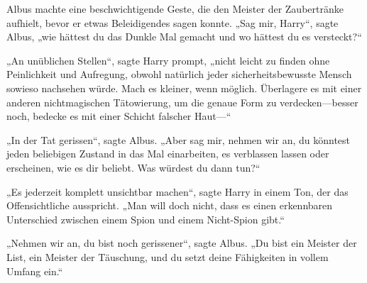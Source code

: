 Albus machte eine beschwichtigende Geste, die den Meister der Zaubertränke aufhielt, bevor er etwas Beleidigendes sagen konnte. „Sag mir, Harry“, sagte Albus, „wie hättest du das Dunkle Mal gemacht und wo hättest du es versteckt?“

„An unüblichen Stellen“, sagte Harry prompt, „nicht leicht zu finden ohne Peinlichkeit und Aufregung, obwohl natürlich jeder sicherheitsbewusste Mensch sowieso nachsehen würde. Mach es kleiner, wenn möglich. Überlagere es mit einer anderen nichtmagischen Tätowierung, um die genaue Form zu verdecken—besser noch, bedecke es mit einer Schicht falscher Haut—“

„In der Tat gerissen“, sagte Albus. „Aber sag mir, nehmen wir an, du könntest jeden beliebigen Zustand in das Mal einarbeiten, es verblassen lassen oder erscheinen, wie es dir beliebt. Was würdest du dann tun?“

„Es jederzeit komplett unsichtbar machen“, sagte Harry in einem Ton, der das Offensichtliche ausspricht. „Man will doch nicht, dass es einen erkennbaren Unterschied zwischen einem Spion und einem Nicht-Spion gibt.“

„Nehmen wir an, du bist noch gerissener“, sagte Albus. „Du bist ein Meister der List, ein Meister der Täuschung, und du setzt deine Fähigkeiten in vollem Umfang ein.“

